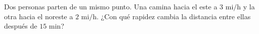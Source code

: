 \item Dos personas parten de un mismo punto. Una camina hacia el este a $3 \text{ mi/h}$ y la otra hacia el noreste a $2 \text{ mi/h}$. ¿Con qué rapidez cambia la distancia entre ellas después de $15 \text{ min}$?
